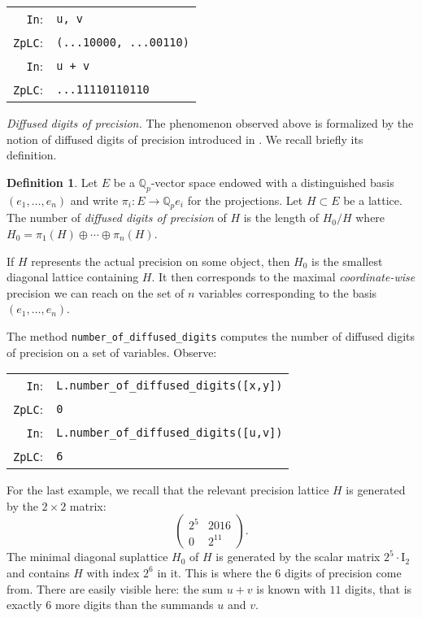 \documentclass[sigconf]{acmart}
\newcommand{\Q}{\mathbb Q}
\newcommand{\Qp}{\Q_p}
\newcommand{\cIn}{{\color{input} \tt \phantom{Zp}In}:}
\newcommand{\cZpLC}{{\color{output} \tt ZpLC}:}
\theoremstyle{definition}
\newtheorem{deftn}[theo]{Definition}
\begin{document}
\smallskip

{\noindent \small
\begin{tabular}{rl}
\cIn   & \verb?u, v? \\
\cZpLC & \verb?(...10000, ...00110)? \\
\cIn   & \verb?u + v? \\
\cZpLC & \verb?...11110110110? \\
\end{tabular}}

\medskip

\noindent \textit{Diffused digits of precision.}
%
The phenomenon observed above is formalized by the notion of diffused
digits of precision introduced in \cite{caruso-roe-vaccon:15}.
We recall briefly its definition.

\begin{deftn}
\label{def:diffused}
Let $E$ be a $\Qp$-vector space endowed with a distinguished basis 
$(e_1, \ldots, e_n)$ and write $\pi_i : E \to \Qp e_i$ for the 
projections.
Let $H \subset E$ be a lattice. The number of \emph{diffused digits of 
precision} of $H$ is the length of $H_0/H$ where $H_0 = \pi_1(H) \oplus 
\cdots \oplus \pi_n(H)$.
\end{deftn}

If $H$ represents the actual precision on some object, then
$H_0$ is the smallest diagonal lattice containing $H$. It then
corresponds to the maximal \emph{coordinate-wise} precision we can 
reach on the set of $n$ variables corresponding to the basis $(e_1,
\ldots, e_n)$.

The method {\color{method}\verb?number_of_diffused_digits?} computes the number of
diffused digits of precision on a set of variables. Observe:

\smallskip

{\noindent \small
\begin{tabular}{rl}
\cIn   & \verb?L.?{\color{method}\verb?number_of_diffused_digits?}\verb?([x,y])? \\
\cZpLC & \verb?0? \\
\cIn   & \verb?L.?{\color{method}\verb?number_of_diffused_digits?}\verb?([u,v])? \\
\cZpLC & \verb?6? \\
\end{tabular}}

\smallskip

\noindent
For the last example, we recall that the relevant precision lattice 
$H$ is generated by the $2 \times 2$ matrix:
$$\left(\begin{matrix} 2^5 & 2016 \\ 0 & 2^{11} \end{matrix}\right).$$
The minimal diagonal suplattice $H_0$ of $H$ is generated by the scalar matrix 
$2^5 \cdot \text{I}_2$ and contains $H$ with index $2^6$ in it. This is 
where the $6$ digits of precision come from.
There are easily visible here: the sum $u+v$ is known with $11$ digits,
that is exactly $6$ more digits than the summands $u$ and $v$.
\end{document}
